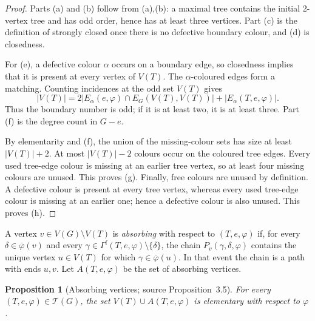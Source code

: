 \documentclass[11pt]{article}
\newtheorem{proposition}[proposition]{Proposition}
\theoremstyle{definition}
\newcommand{\Tcal}{\mathcal T}
\newcommand{\Fcol}{\Gamma^{\mathrm f}}
\newcommand{\set}[1]{\{#1\}}
\newcommand{\comp}{\mathbin{\setminus}}
\begin{document}
\begin{proof}
Parts (a) and (b) follow from
(a),(b): a maximal tree contains the initial
2-vertex tree and has odd order, hence has at least three vertices. Part (c)
is the definition of strongly closed once there is no defective boundary
colour, and (d) is closedness.

For (e), a defective colour $\alpha$ occurs on a boundary edge, so closedness
implies that it is present at every vertex of $V(T)$. The
$\alpha$-coloured edges form a matching. Counting incidences at the odd set
$V(T)$ gives
\[
 |V(T)|=2|E_\alpha(e,\varphi)\cap E_G(V(T),V(T))|
       +|E_\alpha(T,e,\varphi)|.
\]
Thus the boundary number is odd; if it is at least two, it is at least three.
Part (f) is the degree count in $G-e$.

By elementarity and (f), the union of the missing-colour sets has size at
least $|V(T)|+2$. At most $|V(T)|-2$ colours occur on the coloured tree
edges. Every used tree-edge colour is missing at an earlier tree vertex, so
at least four missing colours are unused. This proves (g). Finally, free
colours are unused by definition. A defective colour is present at every
tree vertex, whereas every used tree-edge colour is missing at an earlier
one; hence a defective colour is also unused. This proves (h).
\end{proof}

A vertex $v\in V(G)\comp V(T)$ is \emph{absorbing} with respect to
$(T,e,\varphi)$ if, for every $\delta\in\overline\varphi(v)$ and every
$\gamma\in\Fcol(T,e,\varphi)\comp\set\delta$, the chain
$P_v(\gamma,\delta,\varphi)$ contains the unique vertex
$u\in V(T)$ for which $\gamma\in\overline\varphi(u)$. In that event the
chain is a path with ends $u,v$. Let $A(T,e,\varphi)$ be the set of
absorbing vertices.

\begin{proposition}[Absorbing vertices; source Proposition~3.5]
\label{Scheide-Proposition-3.5}\label{absorbing-elementary}
For every $(T,e,\varphi)\in\Tcal(G)$, the set
$V(T)\cup A(T,e,\varphi)$ is elementary with respect to $\varphi$.
\end{proposition}
\end{document}
